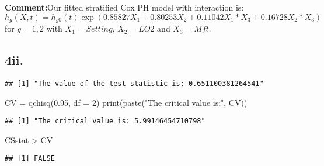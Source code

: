 \documentclass[
]{article}
\newenvironment{Shaded}{\begin{snugshade}}{\end{snugshade}}
\newcommand{\AttributeTok}[1]{\textcolor[rgb]{0.77,0.63,0.00}{#1}}
\newcommand{\DecValTok}[1]{\textcolor[rgb]{0.00,0.00,0.81}{#1}}
\newcommand{\FloatTok}[1]{\textcolor[rgb]{0.00,0.00,0.81}{#1}}
\newcommand{\FunctionTok}[1]{\textcolor[rgb]{0.00,0.00,0.00}{#1}}
\newcommand{\NormalTok}[1]{#1}
\newcommand{\OtherTok}[1]{\textcolor[rgb]{0.56,0.35,0.01}{#1}}
\newcommand{\SpecialCharTok}[1]{\textcolor[rgb]{0.00,0.00,0.00}{#1}}
\newcommand{\StringTok}[1]{\textcolor[rgb]{0.31,0.60,0.02}{#1}}
\begin{document}
\textbf{Comment:}Our fitted stratified Cox PH model with interaction is:
\[
h_g(X,t)=h_{g0}(t)\exp(0.85827X_1+0.80253X_2 + 0.11042X_1*X_3 +0.16728X_2*X_3)
\] for \(g=1,2\) with \(X_1=Setting\), \(X_2=LO2\) and \(X_3=Mft\).

\hypertarget{ii.}{%
\subsection{4ii.}\label{ii.}}

\begin{Shaded}
\end{Shaded}

\begin{verbatim}
## [1] "The value of the test statistic is: 0.651100381264541"
\end{verbatim}

\begin{Shaded}
\begin{Highlighting}[]
\NormalTok{CV }\OtherTok{=} \FunctionTok{qchisq}\NormalTok{(}\FloatTok{0.95}\NormalTok{, }\AttributeTok{df =} \DecValTok{2}\NormalTok{)}
\FunctionTok{print}\NormalTok{(}\FunctionTok{paste}\NormalTok{(}\StringTok{"The critical value is:"}\NormalTok{, CV))}
\end{Highlighting}
\end{Shaded}

\begin{verbatim}
## [1] "The critical value is: 5.99146454710798"
\end{verbatim}

\begin{Shaded}
\begin{Highlighting}[]
\NormalTok{CSstat }\SpecialCharTok{\textgreater{}}\NormalTok{ CV}
\end{Highlighting}
\end{Shaded}

\begin{verbatim}
## [1] FALSE
\end{verbatim}
\end{document}
